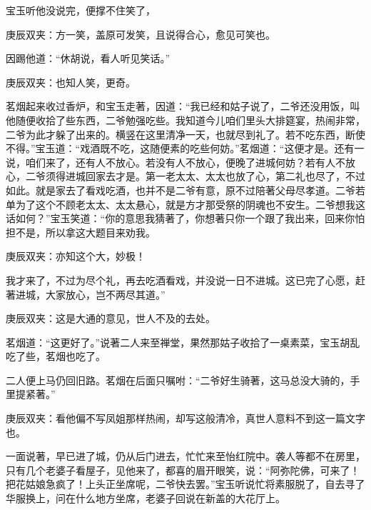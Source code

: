 \begin{parag}
    宝玉听他没说完，便撑不住笑了，\begin{note}庚辰双夹：方一笑，盖原可发笑，且说得合心，愈见可笑也。\end{note}因踢他道：“休胡说，看人听见笑话。”\begin{note}庚辰双夹：也知人笑，更奇。\end{note}茗烟起来收过香炉，和宝玉走著，因道：“我已经和姑子说了，二爷还没用饭，叫他随便收拾了些东西，二爷勉强吃些。我知道今儿咱们里头大排筵宴，热闹非常，二爷为此才躲了出来的。横竖在这里清净一天，也就尽到礼了。若不吃东西，断使不得。”宝玉道：“戏酒既不吃，这随便素的吃些何妨。”茗烟道：“这便才是。还有一说，咱们来了，还有人不放心。若没有人不放心，便晚了进城何妨？若有人不放心，二爷须得进城回家去才是。第一老太太、太太也放了心，第二礼也尽了，不过如此。就是家去了看戏吃酒，也并不是二爷有意，原不过陪著父母尽孝道。二爷若单为了这个不顾老太太、太太悬心，就是方才那受祭的阴魂也不安生。二爷想我这话如何？”宝玉笑道：“你的意思我猜著了，你想著只你一个跟了我出来，回来你怕担不是，所以拿这大题目来劝我。\begin{note}庚辰双夹：亦知这个大，妙极！\end{note}我才来了，不过为尽个礼，再去吃酒看戏，并没说一日不进城。这已完了心愿，赶著进城，大家放心，岂不两尽其道。”\begin{note}庚辰双夹：这是大通的意见，世人不及的去处。\end{note}茗烟道：“这更好了。”说著二人来至禅堂，果然那姑子收拾了一桌素菜，宝玉胡乱吃了些，茗烟也吃了。
\end{parag}


\begin{parag}
    二人便上马仍回旧路。茗烟在后面只嘱咐：“二爷好生骑著，这马总没大骑的，手里提紧著。”\begin{note}庚辰双夹：看他偏不写凤姐那样热闹，却写这般清冷，真世人意料不到这一篇文字也。\end{note}一面说著，早已进了城，仍从后门进去，忙忙来至怡红院中。袭人等都不在房里，只有几个老婆子看屋子，见他来了，都喜的眉开眼笑，说：“阿弥陀佛，可来了！把花姑娘急疯了！上头正坐席呢，二爷快去罢。”宝玉听说忙将素服脱了，自去寻了华服换上，问在什么地方坐席，老婆子回说在新盖的大花厅上。
\end{parag}


